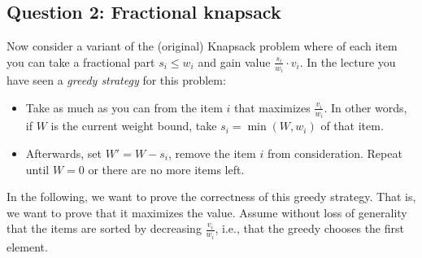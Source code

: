 \subsection*{Question 2: Fractional knapsack}
Now consider a variant of the (original) Knapsack problem where of each item you can take a fractional part $s_i \leq w_i$ and gain value $\frac{s_i}{w_i} \cdot v_i$.
In the lecture you have seen a \emph{greedy strategy} for this problem:
\begin{itemize}
    \item Take as much as you can from the item $i$ that maximizes $\frac{v_i}{w_i}$. In other words, if $W$ is the current weight bound, take $s_i=\min(W,w_i)$ of that item.
    \item Afterwards, set $W' = W-s_i$, remove the item $i$ from consideration. Repeat until $W=0$ or there are no more items left.
\end{itemize}
In the following, we want to prove the correctness of this greedy strategy. That is, we want to prove that it maximizes the value. Assume without loss of generality that the items are sorted by decreasing $\frac{v_i}{w_i}$, i.e., that the greedy chooses the first element.
